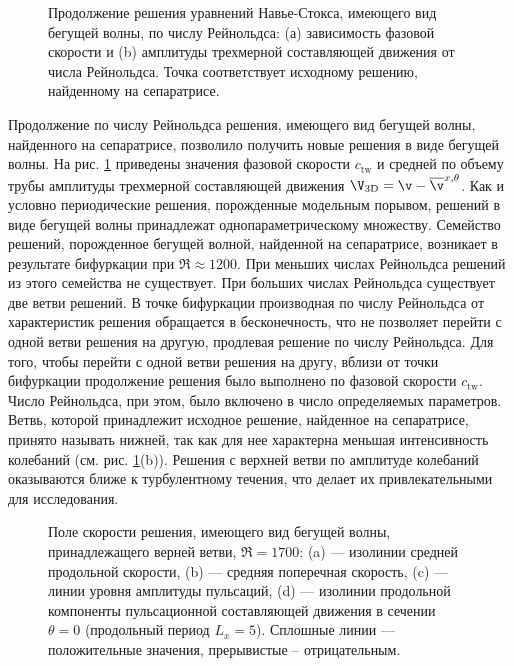 \begin{figure}
\caption{Продолжение решения уравнений Навье-Стокса, имеющего вид бегущей волны, по числу Рейнольдса: (а) зависимость фазовой скорости и (b) амплитуды трехмерной составляющей движения от числа Рейнольдса. Точка соответствует исходному решению, найденному на сепаратрисе.} 
\label{pipeTW_contin_pic}
\end{figure}

Продолжение по числу Рейнольдса решения, имеющего вид бегущей волны, найденного на сепаратрисе, позволило получить новые решения в виде бегущей волны. На рис. \ref{pipeTW_contin_pic} приведены значения фазовой скорости $c_\mathrm{tw}$ и средней по объему трубы амплитуды трехмерной составляющей движения $\V_\mathrm{3D} = \v - \overline{\v}^{x,\theta}$. Как и условно периодические решения, порожденные модельным порывом, решений в виде бегущей волны принадлежат однопараметрическому множеству. Семейство решений, порожденное бегущей волной, найденной на сепаратрисе, возникает в результате бифуркации при $\Re \approx 1200$. При меньших числах Рейнольдса решений из этого семейства не существует. При больших числах Рейнольдса существует две ветви решений. В точке бифуркации производная по числу Рейнольдса от характеристик решения обращается в бесконечность, что не позволяет перейти с одной ветви решения на другую, продлевая решение по числу Рейнольдса. Для того, чтобы перейти с одной ветви решения на другу, вблизи от точки бифуркации продолжение решения было выполнено по фазовой скорости $c_\mathrm{tw}$. Число Рейнольдса, при этом, было включено в число определяемых параметров. Ветвь, которой принадлежит исходное решение, найденное на сепаратрисе, принято называть нижней, так как для нее характерна меньшая интенсивность колебаний (см. рис. \ref{pipeTW_contin_pic}(b)). Решения с верхней ветви по амплитуде колебаний оказываются ближе к турбулентному течения, что делает их привлекательными для исследования. 

\begin{figure}
\caption{Поле скорости решения, имеющего вид бегущей волны, принадлежащего верней ветви, $\Re = 1700$: (a) --- изолинии средней продольной скорости, (b) --- средняя поперечная скорость, (c) --- линии уровня амплитуды пульсаций, (d) --- изолинии продольной компоненты пульсационной составляющей движения в сечении $\theta = 0$ (продольный период $L_x = 5$). Сплошные линии --- положительные значения, прерывистые -- отрицательным. } 
\label{pipeTWub_means_pic}
\end{figure}

